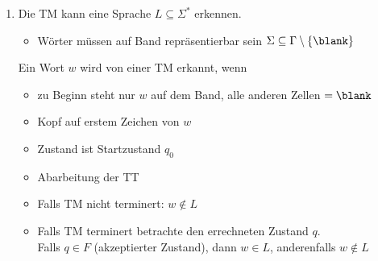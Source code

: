 \begin{enumerate}
	\item Die \ac{TM} kann eine Sprache $L\subseteq\Sigma^*$ erkennen.
	\begin{itemize}
		\item Wörter müssen auf Band repräsentierbar sein $\Sigma\subseteq\Gamma\setminus\{\blank\}$
	\end{itemize}
	Ein Wort $w$ wird von einer \ac{TM} erkannt, wenn
	\begin{itemize}
		\item zu Beginn steht nur $w$ auf dem Band, alle anderen Zellen $=\blank$
		\item Kopf auf erstem Zeichen von $w$
		\item Zustand ist Startzustand $q_0$
		\item Abarbeitung der \ac{TT}
		\item Falls \ac{TM} nicht terminert: $w\notin L$
		\item Falls \ac{TM} terminert betrachte den errechneten Zustand $q$.\\
		Falls $q\in F$ (akzeptierter Zustand), dann $w\in L$, anderenfalls $w\notin L$
	\end{itemize}
	

\end{enumerate}
